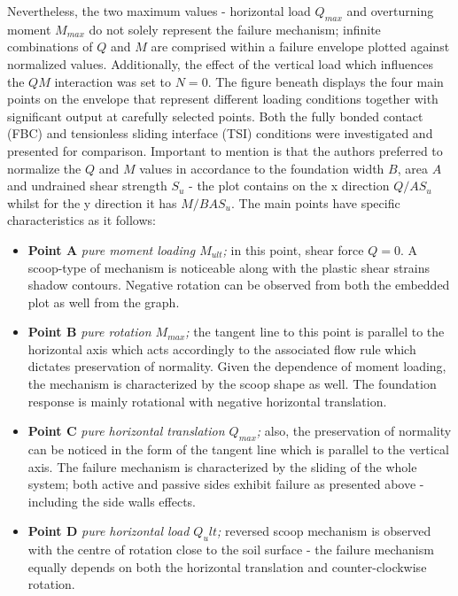 \documentclass[12pt,a4paper]{report}
\begin{document}
Nevertheless, the two maximum values - horizontal load $Q_{max}$ and overturning moment $M_{max}$ do not solely represent the failure mechanism; infinite combinations of $Q$ and $M$ are comprised within a failure envelope plotted against normalized values. Additionally, the effect of the vertical load which influences the $QM$ interaction was set to $N=0$. The figure beneath displays the four main points on the envelope that represent different loading conditions together with significant output at carefully selected points. Both the fully bonded contact (FBC) and tensionless sliding interface (TSI) conditions were investigated and presented for comparison. Important to mention is that the authors preferred to normalize the $Q$ and $M$ values in accordance to the foundation width $B$, area $A$ and undrained shear strength $S_u$ - the plot contains on the x direction $Q/AS_u$ whilst for the y direction it has $M/BAS_u$. 
The main points have specific characteristics as it follows:
\begin{itemize}
	\item \textbf{Point A} \textit{pure moment loading $M_{ult}$;} in this point, shear force $Q=0$. A scoop-type of mechanism is noticeable along with the plastic shear strains shadow contours. Negative rotation can be observed from both the embedded plot as well from the graph.
	\item\textbf{Point B} \textit{pure rotation $M_{max}$;} the tangent line to this point is parallel to the horizontal axis which acts accordingly to the associated flow rule which dictates preservation of normality. Given the dependence of moment loading, the mechanism is characterized by the scoop shape as well. The foundation response is mainly rotational with negative horizontal translation.  
	\item\textbf{Point C} \textit{pure horizontal translation $Q_{max}$;} also, the preservation of normality can be noticed in the form of the tangent line which is parallel to the vertical axis. The failure mechanism is characterized by the sliding of the whole system; both active and passive sides exhibit failure as presented above - including the side walls effects.
	\item\textbf{Point D} \textit{pure horizontal load $Q_ult$;} reversed scoop mechanism is observed with the centre of rotation close to the soil surface - the failure mechanism equally depends on both the horizontal translation and counter-clockwise rotation.
\end{itemize}
\end{document}

